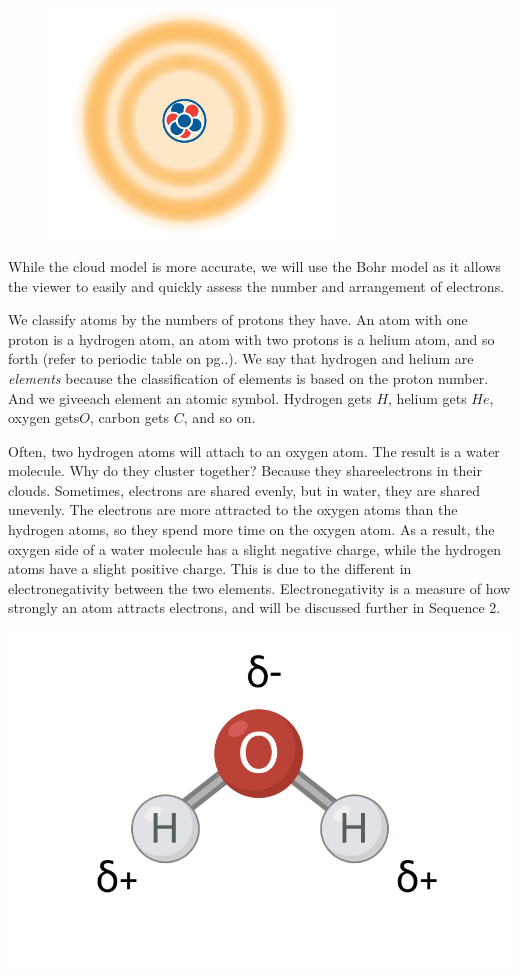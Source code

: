 \begin{figure}
\noindent\includegraphics[trim={0 5cm 0 0}, width=3in]{atomCloud.png}
\end{figure}

While the cloud model is more accurate, we will use the Bohr model as it 
allows the viewer to easily and quickly assess the number and arrangement of 
electrons. 

We classify atoms by the numbers of protons they have. An atom with one proton 
is a hydrogen atom, an atom with two protons is a helium atom, and so forth 
(refer to periodic table on pg..). We say that hydrogen and helium are \textit{
elements} because the classification of elements is based on the proton number. 
And we giveeach element an atomic symbol. Hydrogen gets $H$, helium gets $He$, 
oxygen gets$O$, carbon gets $C$, and so on.

Often, two hydrogen atoms will attach to an oxygen atom. The result is
a water molecule. Why do they cluster together? Because they 
shareelectrons in their clouds. Sometimes, electrons are shared evenly, but in 
water, they are shared unevenly. The electrons are more attracted to the oxygen 
atoms than the hydrogen atoms, so they spend more time on the oxygen atom. As a 
result, the oxygen side of a water molecule has a slight negative charge, while 
the hydrogen atoms have a slight positive charge. This is due to the different 
in electronegativity between the two elements. 
Electronegativity is a measure of how strongly an atom attracts electrons, and 
will be discussed further in Sequence 2.

\includegraphics[scale=1]{water_polar.png}

